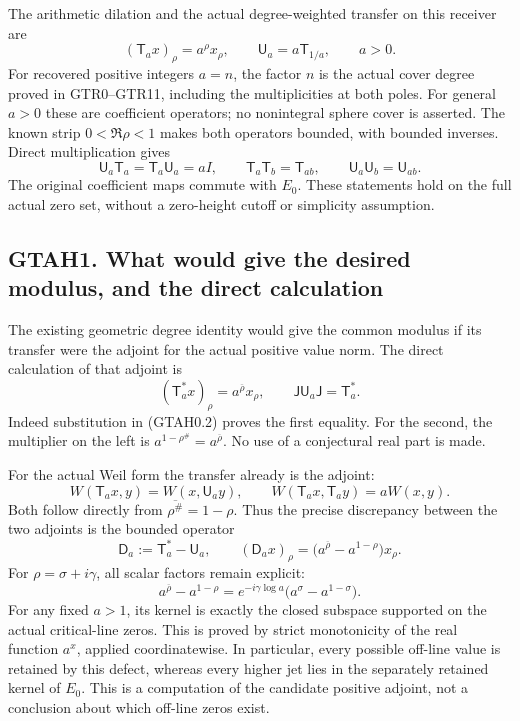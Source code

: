 The arithmetic dilation and the actual degree-weighted transfer on this
receiver are \[
(\mathsf T_a x)_\rho=a^\rho x_\rho,
\qquad
\mathsf U_a=a\mathsf T_{1/a},\qquad a>0.
\tag{GTAH0.5}
\] For recovered positive integers \(a=n\), the factor \(n\) is the
actual cover degree proved in GTR0--GTR11, including the multiplicities
at both poles. For general \(a>0\) these are coefficient operators; no
nonintegral sphere cover is asserted. The known strip \(0<\Re\rho<1\)
makes both operators bounded, with bounded inverses. Direct
multiplication gives \[
\mathsf U_a\mathsf T_a=\mathsf T_a\mathsf U_a=aI,
\qquad \mathsf T_a\mathsf T_b=\mathsf T_{ab},
\qquad \mathsf U_a\mathsf U_b=\mathsf U_{ab}.
\tag{GTAH0.6}
\] The original coefficient maps commute with \(E_0\). These statements
hold on the full actual zero set, without a zero-height cutoff or
simplicity assumption.

\subsection{GTAH1. What would give the desired modulus, and the direct
calculation}\label{gtah1.-what-would-give-the-desired-modulus-and-the-direct-calculation}

The existing geometric degree identity would give the common modulus if
its transfer were the adjoint for the actual positive value norm. The
direct calculation of that adjoint is \[
(\mathsf T_a^*x)_\rho=a^{\overline\rho}x_\rho,
\qquad
\mathsf J\mathsf U_a\mathsf J=\mathsf T_a^*.
\tag{GTAH1.1}
\] Indeed substitution in (GTAH0.2) proves the first equality. For the
second, the multiplier on the left is
\(a^{1-\rho^\#}=a^{\overline\rho}\). No use of a conjectural real part
is made.

For the actual Weil form the transfer already is the adjoint: \[
W(\mathsf T_a x,y)=W(x,\mathsf U_a y),
\qquad W(\mathsf T_a x,\mathsf T_a y)=aW(x,y).
\tag{GTAH1.2}
\] Both follow directly from \(\overline{\rho^\#}=1-\rho\). Thus the
precise discrepancy between the two adjoints is the bounded operator \[
\mathsf D_a:=\mathsf T_a^*-\mathsf U_a,
\qquad
(\mathsf D_a x)_\rho
=\bigl(a^{\overline\rho}-a^{1-\rho}\bigr)x_\rho.
\tag{GTAH1.3}
\] For \(\rho=\sigma+i\gamma\), all scalar factors remain explicit: \[
a^{\overline\rho}-a^{1-\rho}
=e^{-i\gamma\log a}\bigl(a^\sigma-a^{1-\sigma}\bigr).
\tag{GTAH1.4}
\] For any fixed \(a>1\), its kernel is exactly the closed subspace
supported on the actual critical-line zeros. This is proved by strict
monotonicity of the real function \(a^x\), applied coordinatewise. In
particular, every possible off-line value is retained by this defect,
whereas every higher jet lies in the separately retained kernel of
\(E_0\). This is a computation of the candidate positive adjoint, not a
conclusion about which off-line zeros exist.

